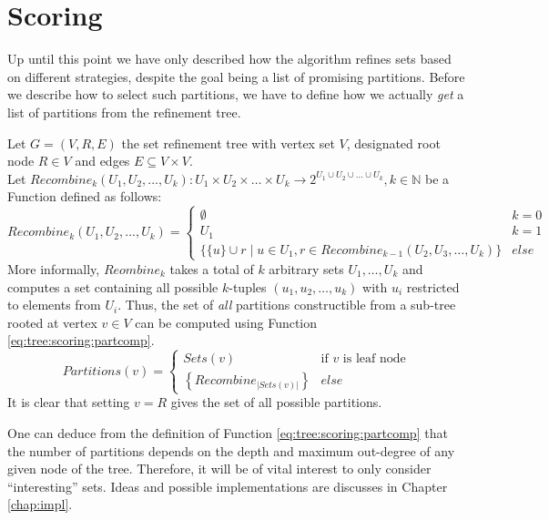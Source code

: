 	\clearpage

	\section{Scoring}
	\label{chap:gcg:scoring}

		Up until this point we have only described how the algorithm refines sets based on different strategies, despite the goal being a list of promising partitions.
		Before we describe how to select such partitions, we have to define how we actually \textit{get} a list of partitions from the refinement tree.

		Let $G = (V, R, E)$ the set refinement tree with vertex set $V$, designated root node $R \in V$ and edges $E \subseteq V \times V$. \\
		Let $Recombine_k(U_1, U_2, \ldots, U_k): U_1 \times U_2 \times \ldots \times U_k \xrightarrow{} 2^{U_1 \cup U_2 \cup \ldots \cup U_k}, k \in \mathbb{N}$ be a Function defined as follows:
		\begin{equation*}
			Recombine_k(U_1, U_2, \ldots, U_k) = \begin{cases}
				\emptyset & k = 0 \\
				U_1 & k = 1 \\
				\{ \{ u \} \cup r \mid u \in U_1, r \in Recombine_{k-1}(U_2, U_3, \ldots, U_k) \} & else
			\end{cases}
		\end{equation*}
		More informally, $Reombine_k$ takes a total of $k$ arbitrary sets $U_1, \ldots, U_k$ and computes a set containing all possible $k$-tuples $(u_1, u_2, \ldots, u_k)$ with $u_i$ restricted to elements from $U_i$.
		Thus, the set of \textit{all} partitions constructible from a sub-tree rooted at vertex $v \in V$ can be computed using Function \ref{eq:tree:scoring:partcomp}.
		\begin{equation}
		\label{eq:tree:scoring:partcomp}
			Partitions(v) = \begin{cases}
				Sets(v) & \text{if $v$ is leaf node} \\
				\left\{ Recombine_{|Sets(v)|} \right\} & else
			\end{cases}
		\end{equation}
		It is clear that setting $v = R$ gives the set of all possible partitions.

		One can deduce from the definition of Function \ref{eq:tree:scoring:partcomp} that the number of partitions depends on the depth and maximum out-degree of any given node of the tree.
		Therefore, it will be of vital interest to only consider \enquote{interesting} sets.
		Ideas and possible implementations are discusses in Chapter \ref{chap:impl}.

